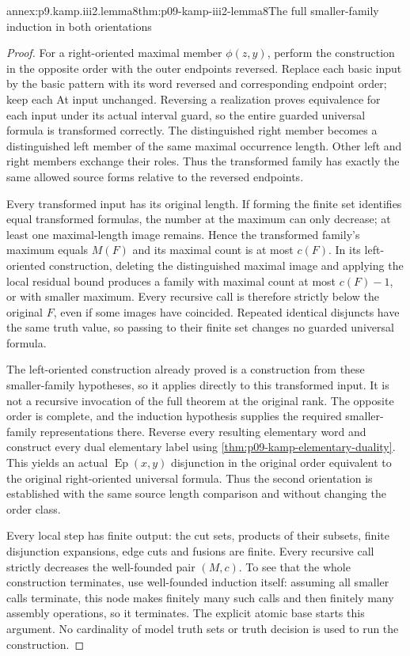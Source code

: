 \begin{annexitem}{annex:p9.kamp.iii2.lemma8}{thm:p09-kamp-iii2-lemma8}{The full smaller-family induction in both orientations}
\begin{proof}
For a right-oriented maximal member \(\phi(z,y)\), perform
the construction in the opposite order with the outer endpoints
reversed. Replace each basic input by the basic pattern with its
word reversed and corresponding endpoint order; keep each At
input unchanged. Reversing a realization proves equivalence for
each input under its actual interval guard, so the entire guarded
universal formula is transformed correctly. The distinguished
right member becomes a distinguished left member of the same
maximal occurrence length. Other left and right members exchange
their roles. Thus the transformed family has exactly the same
allowed source forms relative to the reversed endpoints.

Every transformed input has its original length. If forming the
finite set identifies equal transformed formulas, the number at
the maximum can only decrease; at least one maximal-length image
remains. Hence the transformed family's maximum equals \(M(F)\)
and its maximal count is at most \(c(F)\). In its left-oriented
construction, deleting the distinguished maximal image and applying
the local residual bound produces a family with maximal count at
most \(c(F)-1\), or with smaller maximum. Every recursive
call is therefore strictly below the original \(F\), even
if some images have coincided. Repeated identical disjuncts have
the same truth value, so passing to their finite set changes no
guarded universal formula.

The left-oriented construction already proved is a construction from
these smaller-family hypotheses, so it applies directly to this
transformed input. It is not a recursive invocation of the full
theorem at the original rank. The opposite order is complete,
and the induction hypothesis supplies the required smaller-family
representations there. Reverse every resulting elementary word
and construct every dual elementary label using
\cref{thm:p09-kamp-elementary-duality}. This yields an actual
\(\operatorname{Ep}(x,y)\) disjunction in the original order
equivalent to the original right-oriented universal formula.
Thus the second orientation is established with the same source
length comparison and without changing the order class.

Every local step has finite output: the cut sets, products of their
subsets, finite disjunction expansions, edge cuts and fusions are
finite. Every recursive call strictly decreases the well-founded
pair \((M,c)\). To see that the whole construction terminates,
use well-founded induction itself: assuming all smaller calls
terminate, this node makes finitely many such calls and then finitely
many assembly operations, so it terminates. The explicit atomic
base starts this argument. No cardinality of model truth sets or
truth decision is used to run the construction.


\end{proof}
\end{annexitem}
